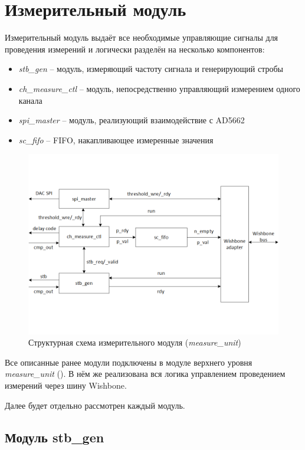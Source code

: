 \section{Измерительный модуль}

Измерительный модуль выдаёт все необходимые управляющие сигналы для проведения измерений и логически разделён на несколько
компонентов:

\begin{itemize}
	\item \emph{stb\_gen} -- модуль, измеряющий частоту сигнала и генерирующий стробы
	\item \emph{ch\_measure\_ctl} -- модуль, непосредственно управляющий измерением одного канала
	\item \emph{spi\_master} -- модуль, реализующий взаимодействие с AD5662
	\item \emph{sc\_fifo} -- FIFO, накапливающее измеренные значения
\end{itemize}

\begin{figure}[ht!] 
	\center
	\includegraphics [scale=0.7] {my_folder/images//mu_struct}
	\caption{Структурная схема измерительного модуля (\emph{measure\_unit})} 
	\label{fig:mu-struct}  
\end{figure}

Все описанные ранее модули подключены в модуле верхнего уровня \emph{measure\_unit} (). В нём же
реализована вся логика управлением проведением измерений через шину Wishbone.

Далее будет отдельно рассмотрен каждый модуль.

\subsection{Модуль stb\_gen}

